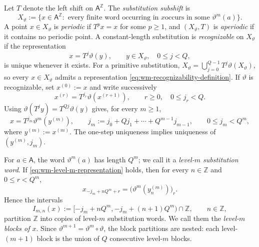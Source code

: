 \documentclass[11pt,reqno,a4paper]{amsart}
\numberwithin{equation}{section}
\theoremstyle{compact}
\theoremstyle{definition}
\theoremstyle{definition}
\begin{document}
Let $T$ denote the left shift on $\mathsf A^{\mathbb Z}$.  The
\emph{substitution subshift} is
\begin{equation}\label{eq:wm-substitution-subshift}
  X_\vartheta
  :=\{x\in\mathsf A^{\mathbb Z}:\text{ every finite word occurring in $x$
  occurs in some $\vartheta^m(a)$}\}.
\end{equation}
A point $x\in X_\vartheta$ is \emph{periodic} if $T^p x=x$ for some
$p\geq1$, and $(X_\vartheta,T)$ is \emph{aperiodic} if it contains no
periodic point.  A constant-length substitution is \emph{recognizable} on
$X_\vartheta$ if the representation
\begin{equation}\label{eq:wm-recognizability-definition}
  x=T^j\vartheta(y),
  \qquad y\in X_\vartheta,\quad 0\leq j<Q,
\end{equation}
is unique whenever it exists.  For a primitive substitution,
$X_\vartheta=\bigcup_{j=0}^{Q-1}T^j\vartheta(X_\vartheta)$, so every
$x\in X_\vartheta$ admits a representation \eqref{eq:wm-recognizability-definition}.
If $\vartheta$ is recognizable, set $x^{(0)}:=x$ and write successively
\[
  x^{(r)}=T^{j_r}\vartheta(x^{(r+1)}),
  \qquad r\geq0,\quad 0\leq j_r<Q.
\]
Using $\vartheta(T^j y)=T^{Qj}\vartheta(y)$ gives, for every $m\geq1$,
\begin{equation}\label{eq:wm-level-m-representation}
  x=T^{j_m}\vartheta^m(y^{(m)}),
  \qquad
  j_m:=j_0+Qj_1+\cdots+Q^{m-1}j_{m-1},
  \qquad 0\leq j_m<Q^m,
\end{equation}
where $y^{(m)}:=x^{(m)}$.  The one-step uniqueness implies uniqueness of
$(y^{(m)},j_m)$.

For $a\in\mathsf A$, the word $\vartheta^m(a)$ has length $Q^m$; we call it
a \emph{level-$m$ substitution word}.  If
\eqref{eq:wm-level-m-representation} holds, then for every $n\in\mathbb Z$
and $0\leq r<Q^m$,
\begin{equation}\label{eq:wm-level-m-coordinate-block}
  x_{-j_m+nQ^m+r}
  =\bigl(\vartheta^m(y^{(m)}_n)\bigr)_r.
\end{equation}
Hence the intervals
\begin{equation}\label{eq:wm-level-m-blocks-definition}
  I_{m,n}(x)
  :=[-j_m+nQ^m,-j_m+(n+1)Q^m)\cap\mathbb Z,
  \qquad n\in\mathbb Z,
\end{equation}
partition $\mathbb Z$ into copies of level-$m$ substitution words.  We call
them the \emph{level-$m$ blocks of $x$}.  Since
$\vartheta^{m+1}=\vartheta^m\circ\vartheta$, the block partitions are nested:
each level-$(m+1)$ block is the union of $Q$ consecutive level-$m$ blocks.
\end{document}
